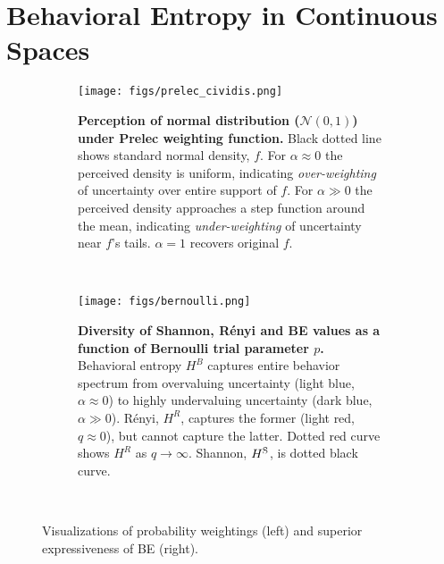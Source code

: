 
\section{Behavioral Entropy in Continuous Spaces} \label{sec:be_in_continuous_spaces}

\begin{figure}[tp]
    \begin{subfigure}[b]{0.48\textwidth}
        \texttt{[image: figs/prelec\_cividis.png]}
        \caption{\small \textbf{Perception of normal distribution ($\mathcal{N}(0,1)$) under Prelec weighting function.} Black dotted line shows standard normal density, $f$. For $\alpha \approx 0$ the perceived density is uniform, indicating \textit{over-weighting} of uncertainty over entire support of $f$. For $\alpha \gg 0$ the perceived density approaches a step function around the mean, indicating \textit{under-weighting} of uncertainty near $f$'s tails. $\alpha = 1$ recovers original $f$.
        }
        \label{fig:prelec_perception}
    \end{subfigure}
    \centering
    ~
    \begin{subfigure}[b]{0.48\textwidth}
        \centering
        \texttt{[image: figs/bernoulli.png]}
        \caption{\small\textbf{Diversity of Shannon, R\'{e}nyi and BE values as a function of Bernoulli trial parameter $p$.} Behavioral entropy $H^B$ captures entire behavior spectrum from overvaluing uncertainty (light blue, $\alpha \approx 0$) to highly undervaluing uncertainty (dark blue, $\alpha \gg 0$). R\'{e}nyi, $H^R$, captures the former (light red, $q \approx 0$), but cannot capture the latter. Dotted red curve shows $H^R$ as $q \rightarrow \infty$. Shannon, $H^{\textup{S}}$, is dotted black curve.
        }
    \label{fig:entropy}
    \end{subfigure}
    \caption{\small Visualizations of probability weightings (left) and superior expressiveness of BE (right).}
    \label{fig:prob_ent}\
    
\vspace{-4mm}
\end{figure}



